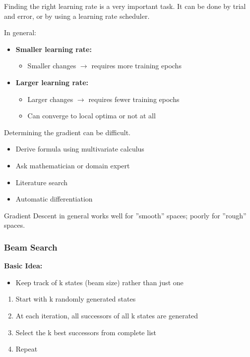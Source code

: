 \documentclass[
../../EiKI_Summary.tex,
]
{subfiles}
\begin{document}
Finding the right learning rate is a very important task. It can be done by trial and error, or by using a learning rate scheduler.

In general:
\begin{itemize}
    \item \textbf{Smaller learning rate:}
    \begin{itemize}
        \item Smaller changes $\rightarrow$ requires more training epochs
    \end{itemize}
    \item \textbf{Larger learning rate:}
    \begin{itemize}
        \item Larger changes $\rightarrow$ requires fewer training epochs
        \item Can converge to local optima or not at all
    \end{itemize}
\end{itemize}

Determining the gradient can be difficult.
\begin{itemize}
    \item Derive formula using multivariate calculus
    \item Ask mathematician or domain expert
    \item Literature search
    \item Automatic differentiation
\end{itemize}

Gradient Descent in general works well for ''smooth'' spaces; poorly for ''rough'' spaces.

\subsubsection{Beam Search}
\textbf{Basic Idea:}
\begin{itemize}
    \item Keep track of k states (beam size) rather than just one
\end{itemize}
\begin{enumerate}
    \item Start with k randomly generated states
    \item At each iteration, all successors of all k states are generated
    \item Select the k best successors from complete list
    \item Repeat
\end{enumerate}
\end{document}
